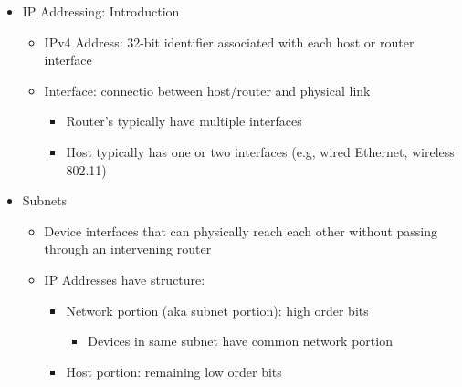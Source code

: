 \begin{itemize}
\begin{itemize}
\begin{itemize}
        \end{itemize}

    \end{itemize}

  \item IP Addressing: Introduction

    \begin{itemize}

      \item IPv4 Address: 32-bit identifier associated with each host or router interface

      \item Interface: connectio between host/router and physical link

        \begin{itemize}

          \item Router's typically have multiple interfaces

          \item Host typically has one or two interfaces (e.g, wired Ethernet, wireless 802.11)

        \end{itemize}

    \end{itemize}

  \item Subnets

    \begin{itemize}

      \item Device interfaces that can physically reach each other without passing through an intervening router

      \item IP Addresses have structure:

        \begin{itemize}

          \item Network portion (aka subnet portion): high order bits

            \begin{itemize}

              \item Devices in same subnet have common network portion

            \end{itemize}

          \item Host portion: remaining low order bits


\end{itemize}
\end{itemize}
\end{itemize}
